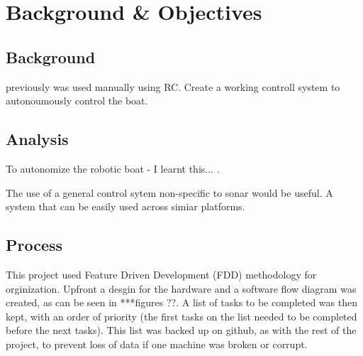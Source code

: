 

\section{Background \& Objectives}

\subsection{Background}
previously was used manually using RC. Create a working controll 
system to autonoumously control the boat. 
\cite{nasa}

\subsection{Analysis}
To autonomize the robotic boat - I learnt this... . 

The use of a general control sytem non-specific to sonar would be useful.
A system that can be easily used across simiar platforms. 







\subsection{Process}
This project used Feature Driven Development (FDD) methodology for orginization.
Upfront a desgin for the hardware and a software flow diagram was created, as can be
seen in ***figures ??. A list of tasks to be completed was then kept, with an order 
of priority (the first tasks on the list needed to be completed before the next tasks).
This list was backed up on github, as with the rest of the project, to prevent loss 
of data if one machine was broken or corrupt. 

